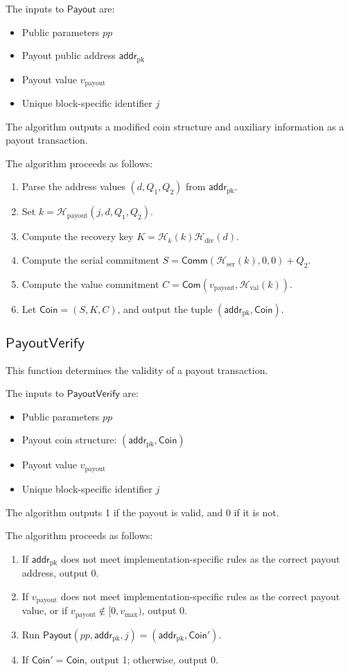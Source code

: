 \documentclass{article}
\newcommand{\func}[1]{\mathsf{#1}}
\newcommand{\com}{\func{Com}}
\newcommand{\comm}{\func{Comm}}
\newcommand{\addr}{\func{addr}}
\newcommand{\hash}{\mathcal{H}}
\theoremstyle{remark}
\begin{document}
The inputs to $\func{Payout}$ are:
\begin{itemize}
    \item Public parameters $pp$
    \item Payout public address $\addr_{\text{pk}}$
    \item Payout value $v_{\text{payout}}$
    \item Unique block-specific identifier $j$
\end{itemize}
The algorithm outputs a modified coin structure and auxiliary information as a payout transaction.

The algorithm proceeds as follows:
\begin{enumerate}
    \item Parse the address values $(d,Q_1,Q_2)$ from $\addr_{\text{pk}}$.
    \item Set $k = \hash_{\text{payout}}(j,d,Q_1,Q_2)$.
    \item Compute the recovery key $K = \hash_k(k)\hash_{\text{div}}(d)$.
    \item Compute the serial commitment $S = \comm(\hash_{\text{ser}}(k),0,0) + Q_2$.
    \item Compute the value commitment $C = \com(v_{\text{payout}},\hash_{\text{val}}(k))$.
    \item Let $\func{Coin} = (S,K,C)$, and output the tuple $(\addr_{\text{pk}},\func{Coin})$.
\end{enumerate}


\subsection{\texorpdfstring{$\func{PayoutVerify}$}{PayoutVerify}}

This function determines the validity of a payout transaction.

The inputs to $\func{PayoutVerify}$ are:
\begin{itemize}
    \item Public parameters $pp$
    \item Payout coin structure: $(\addr_{\text{pk}},\func{Coin})$
    \item Payout value $v_{\text{payout}}$
    \item Unique block-specific identifier $j$
\end{itemize}
The algorithm outputs 1 if the payout is valid, and 0 if it is not.

The algorithm proceeds as follows:
\begin{enumerate}
    \item If $\addr_{\text{pk}}$ does not meet implementation-specific rules as the correct payout address, output 0.
    \item If $v_{\text{payout}}$ does not meet implementation-specific rules as the correct payout value, or if $v_{\text{payout}} \not\in [0,v_{\text{max}})$, output 0.
    \item Run $\func{Payout}(pp,\addr_{\text{pk}},j) = (\addr_{\text{pk}},\func{Coin}')$.
    \item If $\func{Coin}' = \func{Coin}$, output 1; otherwise, output 0.
\end{enumerate}
\end{document}
